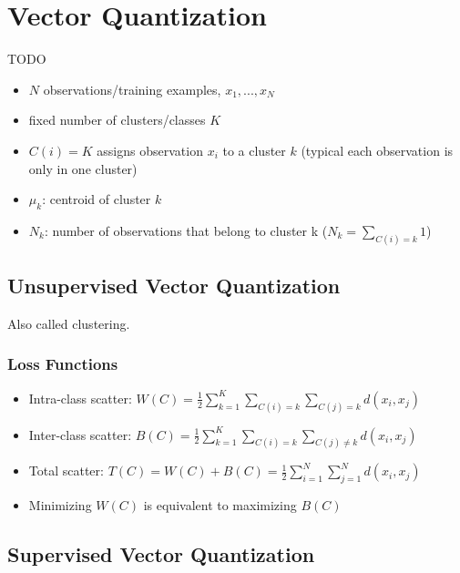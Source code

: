 \chapter{Vector Quantization}\label{chapter:vq}
TODO

\begin{itemize}
\item $N$ observations/training examples, $x_1, ..., x_N$
\item fixed number of clusters/classes $K$
\item $C(i) = K$ assigns observation $x_i$ to a cluster $k$ (typical each observation is only in one cluster)
\item $\mu_k$: centroid of cluster $k$
\item $N_k$: number of observations that belong to cluster k ($N_k = \sum\limits_{C(i)=k} 1$)
\end{itemize}

\section{Unsupervised Vector Quantization}
Also called clustering.

\subsection{Loss Functions}
\begin{itemize}
\item Intra-class scatter: $W(C) = \frac{1}{2} \sum\limits_{k=1}^K \sum\limits_{C(i)=k} \sum\limits_{C(j)=k} d(x_i, x_j)$
\item Inter-class scatter: $B(C) = \frac{1}{2} \sum\limits_{k=1}^K \sum\limits_{C(i)=k} \sum\limits_{C(j)\neq k} d(x_i, x_j)$
\item Total scatter: $T(C) = W(C) + B(C) = \frac{1}{2} \sum\limits_{i=1}^N \sum_{j=1}^N d(x_i, x_j)$
\item Minimizing $W(C)$ is equivalent to maximizing $B(C)$
\end{itemize}



\section{Supervised Vector Quantization}






